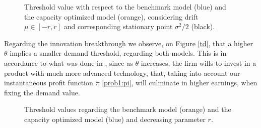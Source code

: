 \begin{figure}[!htb]
	\begin{subfigmatrix}{2}
	\end{subfigmatrix}
	\caption{Threshold value with respect to the benchmark model (blue) and the capacity optimized model (orange), considering drift $\mu \in [-r, r]$ and corresponding stationary point $\sigma^2/2$ (black).}
	\label{fig:mu}
\end{figure}

Regarding the innovation breakthrough we observe, on Figure \ref{td}, that a higher $\theta$ implies a smaller demand threshold, regarding both models. This is in accordance to what was done in \cite{rita}, since as $\theta$ increases, the firm wills to invest in a product with much more advanced technology, that, taking into account our instantaneous profit function $\pi$ \eqref{prob1:pi}, will culminate in higher earnings, when fixing the demand value.

\begin{figure}[!htb]
	\centering
	\caption{Threshold values regarding the benchmark model (orange) and the capacity optimized model (blue) and decreasing parameter $r$.}
\label{fig:td}
\end{figure}


